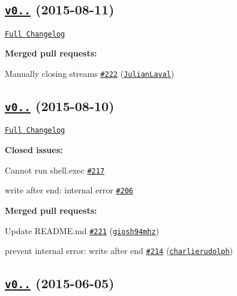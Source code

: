 \subsection*{\href{https://github.com/shelljs/shelljs/tree/v0.5.3}{\tt v0..} (2015-\/08-\/11)}

\href{https://github.com/shelljs/shelljs/compare/v0.5.2...v0.5.3}{\tt Full Changelog}

{\bfseries Merged pull requests\+:}


\begin{DoxyItemize}
\item Manually closing streams \href{https://github.com/shelljs/shelljs/pull/222}{\tt \#222} (\href{https://github.com/JulianLaval}{\tt Julian\+Laval})
\end{DoxyItemize}

\subsection*{\href{https://github.com/shelljs/shelljs/tree/v0.5.2}{\tt v0..} (2015-\/08-\/10)}

\href{https://github.com/shelljs/shelljs/compare/v0.5.1...v0.5.2}{\tt Full Changelog}

{\bfseries Closed issues\+:}


\begin{DoxyItemize}
\item Cannot run shell.\+exec \href{https://github.com/shelljs/shelljs/issues/217}{\tt \#217}
\item write after end\+: internal error \href{https://github.com/shelljs/shelljs/issues/206}{\tt \#206}
\end{DoxyItemize}

{\bfseries Merged pull requests\+:}


\begin{DoxyItemize}
\item Update R\+E\+A\+D\+M\+E.\+md \href{https://github.com/shelljs/shelljs/pull/221}{\tt \#221} (\href{https://github.com/giosh94mhz}{\tt giosh94mhz})
\item prevent internal error\+: write after end \href{https://github.com/shelljs/shelljs/pull/214}{\tt \#214} (\href{https://github.com/charlierudolph}{\tt charlierudolph})
\end{DoxyItemize}

\subsection*{\href{https://github.com/shelljs/shelljs/tree/v0.5.1}{\tt v0..} (2015-\/06-\/05)}

